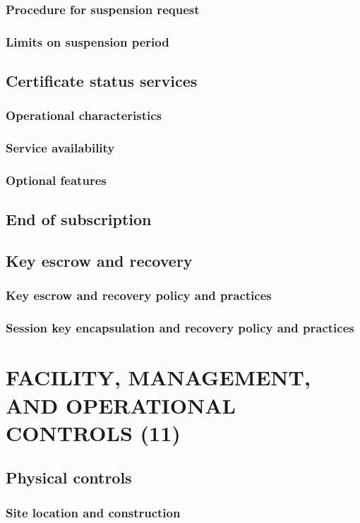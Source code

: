 \documentclass[10pt]{article}
\begin{document}
\subsubsection{Procedure for suspension request}
\subsubsection{Limits on suspension period}
\subsection{Certificate status services}
\subsubsection{Operational characteristics}
\subsubsection{Service availability}
\subsubsection{Optional features}
\subsection{End of subscription}
\subsection{Key escrow and recovery}
\subsubsection{Key escrow and recovery policy and practices}
\subsubsection{Session key encapsulation and recovery policy and practices}
\section{FACILITY, MANAGEMENT, AND OPERATIONAL CONTROLS (11)}
\subsection{Physical controls}
\subsubsection{Site location and construction}
\end{document}
